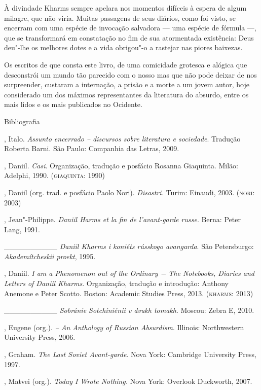 À divindade Kharms sempre apelara nos momentos difíceis à espera de
algum milagre, que não viria. Muitas passagens de seus diários, como foi
visto, se encerram com uma espécie de invocação salvadora --- uma espécie
de fórmula ---, que se transformará em constatação no fim de sua
atormentada existência: Deus deu"-lhe os melhores dotes e a vida
obrigou"-o a rastejar nas piores baixezas.

Os escritos de que consta este livro, de uma comicidade grotesca e
alógica que desconstrói um mundo tão parecido com o nosso mas que não
pode deixar de nos surpreender, custaram a internação, a prisão e a
morte a um jovem autor, hoje considerado um dos máximos representantes
da literatura do absurdo, entre os mais lidos e os mais publicados no
Ocidente.

Bibliografia

, Italo. \emph{Assunto encerrado -- discursos sobre literatura
e sociedade}. Tradução Roberta Barni. São Paulo: Companhia das Letras,
2009.

, Daniil. \emph{Casi}. Organização, tradução e posfácio
Rosanna Giaquinta. Milão: Adelphi, 1990. (\textsc{giaquinta}: 1990)

, Daniil (org. trad. e posfácio Paolo Nori). \emph{Disastri.}
Turim: Einaudi, 2003. (\textsc{nori}: 2003)

, Jean"-Philippe. \emph{Daniil Harms et la fin de
l'avant-garde russe}. Berna: Peter Lang, 1991.

\_\_\_\_\_\_\_\_\_\_ \emph{Daniil Kharms i koniéts rússkogo
avangarda}. São Petersburgo: \emph{Akademítcheskii proekt}, 1995.

, Daniil. \emph{I am a Phenomenon out of the Ordinary −
The Notebooks, Diaries and Letters of Daniil Kharms}. Organização,
tradução e introdução: Anthony Anemone e Peter Scotto. Boston: Academic
Studies Press, 2013. (\textsc{kharms}: 2013)

\_\_\_\_\_\_\_\_\_\_ \emph{Sobránie Sotchiniénii v dvukh
tomakh}. Moscou: Zebra E, 2010.

, Eugene (org.). \emph{ -- An Anthology of
Russian Absurdism}. Illinois: Northwestern University Press, 2006.

, Graham. \emph{The Last Soviet Avant-garde}. Nova York:
Cambridge University Press, 1997.

, Matvei (org.). \emph{Today I Wrote Nothing.} Nova York:
Overlook Duckworth, 2007.


